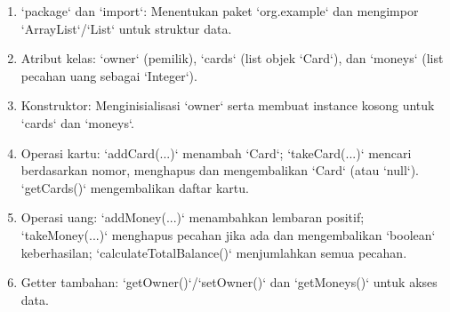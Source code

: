 \documentclass[a4paper,12pt]{article}
\begin{document}
\begin{sloppypar}
    \begin{enumerate}
        \item `package` dan `import`: Menentukan paket `org.example` dan mengimpor `ArrayList`/`List` untuk struktur data.
        \item Atribut kelas: `owner` (pemilik), `cards` (list objek `Card`), dan `moneys` (list pecahan uang sebagai `Integer`).
        \item Konstruktor: Menginisialisasi `owner` serta membuat instance kosong untuk `cards` dan `moneys`.
        \item Operasi kartu: `addCard(...)` menambah `Card`; `takeCard(...)` mencari berdasarkan nomor, menghapus dan mengembalikan `Card` (atau `null`). `getCards()` mengembalikan daftar kartu.
        \item Operasi uang: `addMoney(...)` menambahkan lembaran positif; `takeMoney(...)` menghapus pecahan jika ada dan mengembalikan `boolean` keberhasilan; `calculateTotalBalance()` menjumlahkan semua pecahan.
        \item Getter tambahan: `getOwner()`/`setOwner()` dan `getMoneys()` untuk akses data.
    \end{enumerate}
\end{sloppypar}
\end{document}

